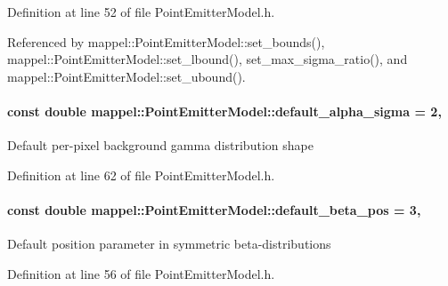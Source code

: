 Definition at line 52 of file Point\+Emitter\+Model.\+h.



Referenced by mappel\+::\+Point\+Emitter\+Model\+::set\+\_\+bounds(), mappel\+::\+Point\+Emitter\+Model\+::set\+\_\+lbound(), set\+\_\+max\+\_\+sigma\+\_\+ratio(), and mappel\+::\+Point\+Emitter\+Model\+::set\+\_\+ubound().

\paragraph[{\texorpdfstring{default\+\_\+alpha\+\_\+sigma}{default_alpha_sigma}}]{\setlength{\rightskip}{0pt plus 5cm}const double mappel\+::\+Point\+Emitter\+Model\+::default\+\_\+alpha\+\_\+sigma = 2\hspace{0.3cm}{\ttfamily [static]}, {\ttfamily [inherited]}}\hypertarget{classmappel_1_1PointEmitterModel_a0d9f2c5438940f329e75708987e8b343}{}\label{classmappel_1_1PointEmitterModel_a0d9f2c5438940f329e75708987e8b343}
Default per-\/pixel background gamma distribution shape 

Definition at line 62 of file Point\+Emitter\+Model.\+h.

\paragraph[{\texorpdfstring{default\+\_\+beta\+\_\+pos}{default_beta_pos}}]{\setlength{\rightskip}{0pt plus 5cm}const double mappel\+::\+Point\+Emitter\+Model\+::default\+\_\+beta\+\_\+pos = 3\hspace{0.3cm}{\ttfamily [static]}, {\ttfamily [inherited]}}\hypertarget{classmappel_1_1PointEmitterModel_a9b64c3b4b97ac2805340c0779c71398c}{}\label{classmappel_1_1PointEmitterModel_a9b64c3b4b97ac2805340c0779c71398c}
Default position parameter in symmetric beta-\/distributions 

Definition at line 56 of file Point\+Emitter\+Model.\+h.

